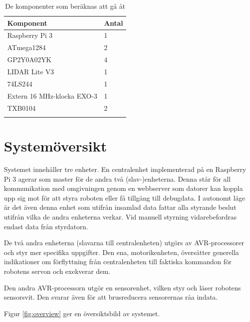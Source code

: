 \documentclass[a4paper,titlepage,12pt]{article}
\begin{document}
	\begin{longtable}[c]{l l}
		\textbf{Komponent} & \textbf{Antal} \\ \midrule
		Raspberry Pi 3 & 1 \\
		ATmega1284 & 2 \\
		GP2Y0A02YK & 4 \\
		LIDAR Lite V3 & 1 \\
		74LS244 & 1 \\
		Extern 16 MHz-klocka EXO-3 & 1 \\
		TXB0104 & 2 \\
		\caption{De komponenter som beräknas att gå åt \label{table:components}}
	\end{longtable}


	\section{Systemöversikt}
	Systemet innehåller tre enheter. En centralenhet implementerad på en Raspberry Pi 3 
	agerar som master för de andra två (slav-)enheterna. Denna står för all kommunikation 
	med omgivningen genom en webbserver som datorer kan koppla upp sig mot för att styra roboten 
	eller få tillgång till debugdata. I autonomt läge är det även denna enhet som utifrån 
	insamlad data fattar alla styrande beslut utifrån vilka de andra enheterna 
	verkar. Vid manuell styrning vidarebefordras endast data från styrdatorn.

	De två andra enheterna (slavarna till centralenheten) utgörs av AVR-processorer och styr 
	mer specifika uppgifter. Den ena, motorikenheten, översätter generella indikationer om 
	förflyttning från centralenheten till faktiska kommandon för robotens
    servon och exekverar dem.
    
    Den andra AVR-processorn utgör en sensorenhet, vilken styr och läser
    robotens sensorsvit.  Den svarar även för att brusreducera sensorernas råa indata. 
    
    Figur \ref{fig:overview} ger en översiktsbild av systemet.
	
\end{document}
